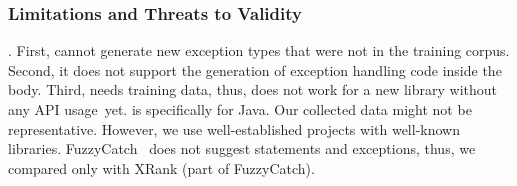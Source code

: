 
\subsubsection*{\bf Limitations and Threats to Validity}.
First, {\tool} cannot generate new exception types that were not in
the training corpus. Second, it does not support the generation of
exception handling code inside the  body. Third,
{\tool} needs training data, thus, does not work for a new library
without any API usage~yet. {\tool} is specifically for Java. Our
collected data might not be representative. However, we use
well-established projects with well-known
libraries. FuzzyCatch~\cite{xrank-fse20} does not suggest statements
and exceptions, thus, we compared only with XRank (part of FuzzyCatch).
